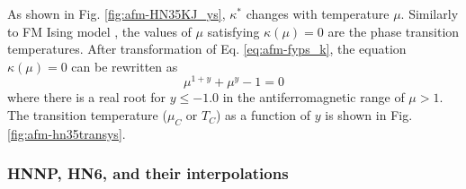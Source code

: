 As shown in Fig. \ref{fig:afm-HN35KJ_ys}, $\kappa^*$ changes with temperature $\mu$. Similarly to FM Ising model \cite{Boettcher2011HNNP}, the values of $\mu$ satisfying $\kappa(\mu)=0$ are the phase transition temperatures. After transformation of Eq. \ref{eq:afm-fyps_k}, the equation $\kappa(\mu)=0$ can be rewritten as 
\begin{equation}
\mu^{1+y} + \mu^y -1 =0
\end{equation}
where there is a real root for $y\le-1.0$ in the antiferromagnetic range of $\mu>1$.  The transition temperature ($\mu_C$ or $T_C$) as a function of $y$ is shown in Fig.  \ref{fig:afm-hn35transys}.


\subsubsection{ HNNP, HN6, and their interpolations }

